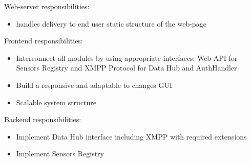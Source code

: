   Web-server responsibilities:
  \begin{itemize}
  \item handles delivery to end user static structure of the web-page
  \end{itemize}
  Frontend responsibilities:
  \begin{itemize}
  \item Interconnect all modules by using appropriate interfaces: Web API for Sensors Registry and XMPP Protocol for Data Hub and AuthHandler
  \item Build a responsive and adaptable to changes GUI
  \item Scalable system structure
  \end{itemize}
    Backend responsibilities:
  \begin{itemize}
  \item Implement Data Hub interface including XMPP with required extensions
  \item Implement Sensors Registry
  \end{itemize}